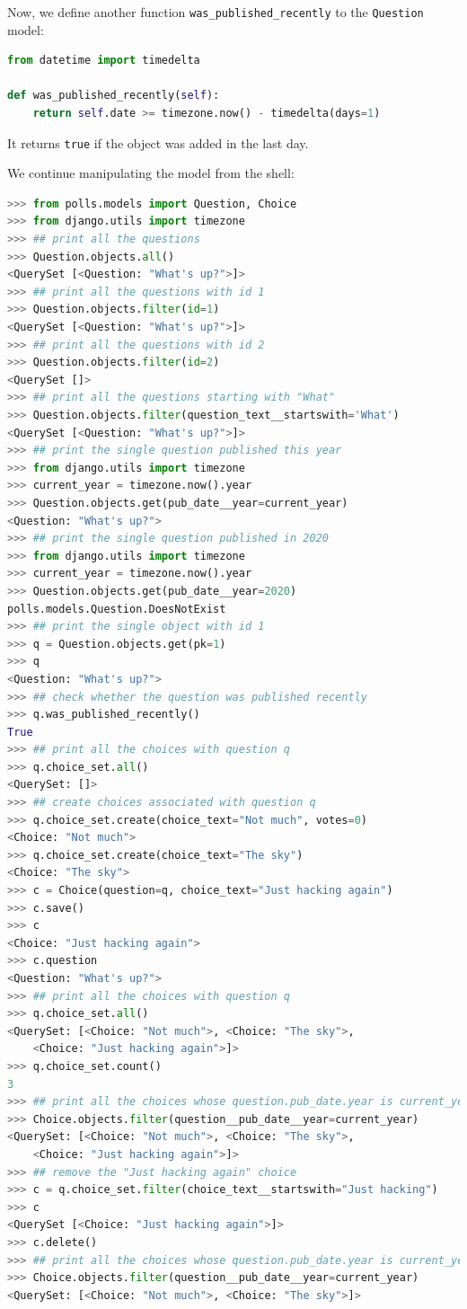 \documentclass[a4paper, openany]{memoir}
\begin{document}
    Now, we define another function \texttt{was\_published\_recently} to the \texttt{Question} model:
\begin{lstlisting}[language=python]
from datetime import timedelta

def was_published_recently(self):
    return self.date >= timezone.now() - timedelta(days=1)
\end{lstlisting}
    It returns \texttt{true} if the object was added in the last day. 

    We continue manipulating the model from the shell:
\begin{lstlisting}[language=python]
>>> from polls.models import Question, Choice
>>> from django.utils import timezone
>>> ## print all the questions
>>> Question.objects.all()
<QuerySet [<Question: "What's up?">]>
>>> ## print all the questions with id 1
>>> Question.objects.filter(id=1)
<QuerySet [<Question: "What's up?">]>
>>> ## print all the questions with id 2
>>> Question.objects.filter(id=2)
<QuerySet []>
>>> ## print all the questions starting with "What"
>>> Question.objects.filter(question_text__startswith='What')
<QuerySet [<Question: "What's up?">]>
>>> ## print the single question published this year
>>> from django.utils import timezone
>>> current_year = timezone.now().year
>>> Question.objects.get(pub_date__year=current_year)
<Question: "What's up?">
>>> ## print the single question published in 2020
>>> from django.utils import timezone
>>> current_year = timezone.now().year
>>> Question.objects.get(pub_date__year=2020)
polls.models.Question.DoesNotExist
>>> ## print the single object with id 1
>>> q = Question.objects.get(pk=1)
>>> q
<Question: "What's up?">
>>> ## check whether the question was published recently
>>> q.was_published_recently()
True
>>> ## print all the choices with question q
>>> q.choice_set.all()
<QuerySet: []>
>>> ## create choices associated with question q
>>> q.choice_set.create(choice_text="Not much", votes=0)
<Choice: "Not much">
>>> q.choice_set.create(choice_text="The sky")
<Choice: "The sky">
>>> c = Choice(question=q, choice_text="Just hacking again")
>>> c.save()
>>> c
<Choice: "Just hacking again">
>>> c.question
<Question: "What's up?">
>>> ## print all the choices with question q
>>> q.choice_set.all()
<QuerySet: [<Choice: "Not much">, <Choice: "The sky">, 
    <Choice: "Just hacking again">]>
>>> q.choice_set.count()
3
>>> ## print all the choices whose question.pub_date.year is current_year
>>> Choice.objects.filter(question__pub_date__year=current_year)
<QuerySet: [<Choice: "Not much">, <Choice: "The sky">, 
    <Choice: "Just hacking again">]>
>>> ## remove the "Just hacking again" choice
>>> c = q.choice_set.filter(choice_text__startswith="Just hacking")
>>> c
<QuerySet [<Choice: "Just hacking again">]>
>>> c.delete()
>>> ## print all the choices whose question.pub_date.year is current_year
>>> Choice.objects.filter(question__pub_date__year=current_year)
<QuerySet: [<Choice: "Not much">, <Choice: "The sky">]>
\end{lstlisting}
\end{document}
